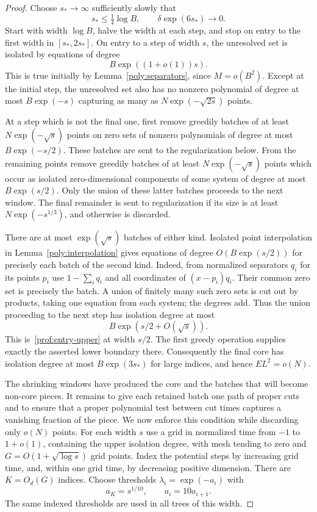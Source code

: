 \begin{proof}
Choose $s_*\to\infty$ sufficiently slowly that
\[
 s_*\le\tfrac14\log B,\qquad \delta\exp(6s_*)\longrightarrow0.
\]
Start with width $\log B$, halve the width at each step, and stop on
entry to the first width in $[s_*,2s_*]$.  On entry to a step of width
$s$, the unresolved set is isolated by equations of degree
\begin{equation}\label{prof:entry-upper}
 B\exp((1+o(1))s).
\end{equation}
This is true initially by Lemma~\ref{poly:separators}, since
$M=o(B^2)$.  Except at the initial step, the unresolved set also has no
nonzero polynomial of degree at most $B\exp(-s)$ capturing as many as
$N\exp(-\sqrt{2s})$ points.

At a step which is not the final one, first remove greedily batches of
at least $N\exp(-\sqrt{s})$ points on zero sets of nonzero polynomials
of degree at most $B\exp(-s/2)$.  These batches are sent to the
regularization below.  From the remaining points remove greedily
batches of at least $N\exp(-\sqrt{s})$ points which occur as isolated
zero-dimensional components of some system of degree at most
$B\exp(s/2)$.  Only the union of these latter batches proceeds to the
next window.  The final remainder is sent to regularization if its
size is at least $N\exp(-s^{1/3})$, and otherwise is discarded.

There are at most $\exp(\sqrt{s})$ batches of either kind.  Isolated
point interpolation in Lemma~\ref{poly:interpolation} gives equations of
degree $O(B\exp(s/2))$ for precisely each batch of the second kind.
Indeed, from normalized separators $q_i$ for its points $p_i$ use
$1-\sum_iq_i$ and all coordinates of $(x-p_i)q_i$.  Their common zero
set is precisely the batch.  A union of finitely many such zero sets
is cut out by products, taking one equation from each system; the
degrees add.  Thus the union proceeding to the next step has isolation
degree at most
\[
 B\exp(s/2+O(\sqrt{s})).
\]
This is~\eqref{prof:entry-upper} at width $s/2$.  The first greedy
operation supplies exactly the asserted lower boundary there.
Consequently the final core has isolation degree at most
$B\exp(3s_*)$ for large indices, and hence $EL^2=o(N)$.

The shrinking windows have produced the core and the batches that
will become non-core pieces.  It remains to give each retained batch
one path of proper cuts and to ensure that a proper polynomial test
between cut times captures a vanishing fraction of the piece.  We
now enforce this condition while discarding only $o(N)$ points.
For each width $s$ use a grid in normalized time from $-1$ to
$1+o(1)$, containing the upper isolation degree, with mesh tending to
zero and $G=O(1+\sqrt{\log s})$ grid points.  Index the potential steps
by increasing grid time, and, within one grid time, by decreasing
positive dimension.  There are $K=O_d(G)$ indices.  Choose thresholds
$\lambda_i=\exp(-a_i)$ with
\begin{equation}\label{prof:lambda-hierarchy}
 a_K=s^{1/10},\qquad a_i=10a_{i+1}.
\end{equation}
The same indexed thresholds are used in all trees of this width.


\end{proof}
